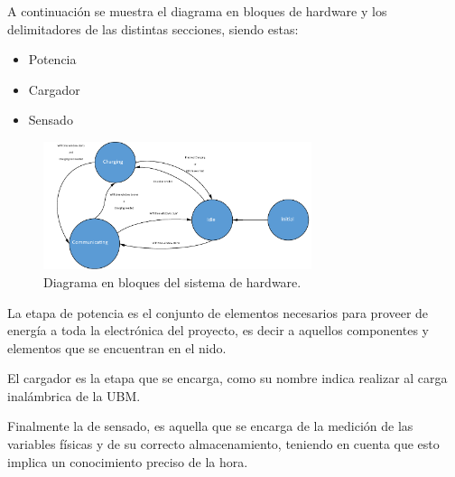 A continuación se muestra el diagrama en bloques de hardware y los delimitadores de las distintas secciones, siendo estas:
\begin{itemize}
\item Potencia
\item Cargador
\item Sensado
\end{itemize}

\begin{figure}[H]
	\centering
	\includegraphics[width=0.7\textwidth, page=7]{ImagenesIngenieria de Detalle/FlowChart.pdf}		
	\caption{Diagrama en bloques del sistema de hardware.}
	\label{fig:diagrama_hardware}
\end{figure}

La etapa de potencia es el conjunto de elementos necesarios para proveer de energía a toda la electrónica del proyecto, es decir a aquellos componentes y elementos que se encuentran en el nido.

El cargador es la etapa que se encarga, como su nombre indica realizar al carga inalámbrica de la UBM.

Finalmente la de sensado, es aquella que se encarga de la medición de las variables físicas y de su correcto almacenamiento, teniendo en cuenta que esto implica un conocimiento preciso de la hora.